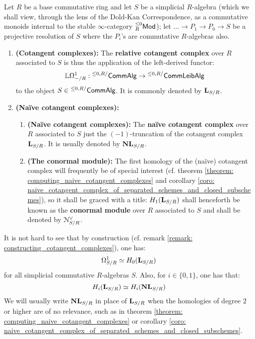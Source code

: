                 \begin{definition} \label{def: cotangent_complexes}  
                    Let $R$ be a base commutative ring and let $S$ be a simplicial $R$-algebra (which we shall view, through the lens of the Dold-Kan Correspondence, as a commutative monoids internal to the stable $\infty$-category ${}_R^{\leq 0}\mathsf{Mod}$); let $... \to P_1 \to P_0 \to S$ be a projective resolution of $S$ where the $P_i$'s are commutative $R$-algebras also. 
                    \begin{enumerate}
                        \item \textbf{(Cotangent complexes):} The \textbf{relative cotangent complex} over $R$ associated to $S$ is thus the application of the left-derived functor:
                            $$\mathbb{L}\Omega^1_{-/R}: {}^{\leq0, R/}\mathsf{Comm}\mathsf{Alg} \to {}^{\leq0, R/}\mathsf{Comm}\mathsf{Leib}\mathsf{Alg}$$
                        to the object $S \in {}^{\leq 0, R/}\mathsf{Comm}\mathsf{Alg}$. It is commonly denoted by $\mathbf{L}_{S/R}$.
                        \item \textbf{(Na\"ive cotangent complexes):} 
                            \begin{enumerate}
                                \item \textbf{(Na\"ive cotangent complexes):}  The \textbf{na\"ive cotangent complex} over $R$ associated to $S$ just the $(-1)$-truncation of the cotangent complex $\mathbf{L}_{S/R}$. It is usually denoted by $\mathbf{NL}_{S/R}$.
                                \item \textbf{(The conormal module):} The first homology of the (na\"ive) cotangent complex will frequently be of special interest (cf. theorem \ref{theorem: computing_naive_cotangent_complexes} and corollary \ref{coro: naive_cotangent_complex_of_separated_schemes_and_closed_subschemes}), so it shall be graced with a title: $H_1(\mathbf{L}_{S/R})$ shall henceforth be known as the \textbf{conormal module} over $R$ associated to $S$ and shall be denoted by $\mathcal{N}^{\vee}_{S/R}$.
                            \end{enumerate}
                    \end{enumerate}
                \end{definition}
                \begin{remark}
                    It is not hard to see that by construction (cf. remark \ref{remark: constructing_cotangent_complexes}), one has:
                        $$\Omega^1_{S/R} \simeq H_0(\mathbf{L}_{S/R})$$
                    for all simplicial commutative $R$-algebras $S$. Also, for $i \in \{0, 1\}$, one has that:
                        $$H_i(\mathbf{L}_{S/R}) \simeq H_i(\mathbf{NL}_{S/R})$$
                    We will usually write $\mathbf{NL}_{S/R}$ in place of $\mathbf{L}_{S/R}$ when the homologies of degree $2$ or higher are of no relevance, such as in theorem \ref{theorem: computing_naive_cotangent_complexes} or corollary \ref{coro: naive_cotangent_complex_of_separated_schemes_and_closed_subschemes}.
                \end{remark}
                
